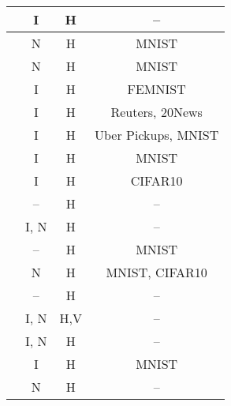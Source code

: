 \begin{table}[ht]
\begin{tabular}{c|c|c|c}
\cite{8733825}                      & I                 & H              & --                                 \\ \hline
\cite{8893114}                      & N                 & H              & MNIST                              \\ \hline
\cite{9274451}                      & N                 & H              & MNIST                              \\ \hline
\cite{9293091}                      & I                 & H              & FEMNIST                            \\ \hline
\cite{8843900}                      & I                 & H              & Reuters, 20News                    \\ \hline
\cite{8998397}                      & I                 & H              & Uber Pickups, MNIST                \\ \hline
\cite{9311394}                      & I                 & H              & MNIST                              \\ \hline
\cite{9170905}                      & I                 & H              & CIFAR10                            \\ \hline
\cite{10.48550/arxiv.2009.09338}    & --                & H              & --                                 \\ \hline
\cite{8892848}                      & I, N              & H              & --                                 \\ \hline
\cite{8945913}                      & --                & H              & MNIST                              \\ \hline
\cite{10.48550/arxiv.2202.02817}    & N                 & H              & MNIST, CIFAR10                     \\ \hline
\cite{10.48550/arxiv.2007.03856}    & --                & H              & --                                 \\ \hline
\cite{10.48550/arxiv.1912.04859}    & I, N              & H,V            & --                                 \\ \hline
\cite{10.48550/arxiv.1910.12603}    & I, N              & H              & --                                 \\ \hline
\cite{9321132}                      & I                 & H              & MNIST                              \\ \hline
\cite{Peyvandi2022}                 & N                 & H              & --                                 \\ \hline

\end{tabular}
\end{table}
